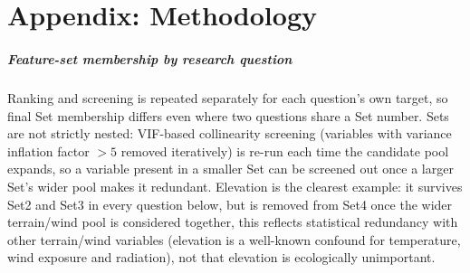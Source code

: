 \chapter{Appendix: Methodology}

\paragraph*{Feature-set membership by research question}
\label{app:feature-sets}
%

Ranking and screening is repeated separately for each question's own target, so final Set
membership differs even where two questions share a Set number. Sets are not strictly nested:
VIF-based collinearity screening (variables with variance inflation factor $>5$ removed
iteratively) is re-run each time the candidate pool expands, so a variable present in a smaller
Set can be screened out once a larger Set's wider pool makes it redundant. Elevation is the
clearest example: it survives Set2 and Set3 in every question below, but is removed from Set4
once the wider terrain/wind pool is considered together, this reflects statistical redundancy
with other terrain/wind variables (elevation is a well-known confound for temperature, wind
exposure and radiation), not that elevation is ecologically unimportant.

